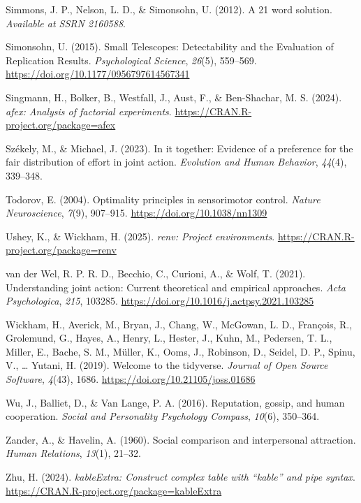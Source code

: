 \documentclass[
  man,
  floatsintext,
  longtable,
  nolmodern,
  notxfonts,
  notimes,
  colorlinks=true,linkcolor=blue,citecolor=blue,urlcolor=blue]{apa7}
\newlength{\cslhangindent}
\newenvironment{CSLReferences}[2] %
 {\begin{list}{}{%
  \setlength{\itemindent}{0pt}
  \setlength{\leftmargin}{0pt}
  \setlength{\parsep}{0pt}
  \ifodd #1
   \setlength{\leftmargin}{\cslhangindent}
   \setlength{\itemindent}{-1\cslhangindent}
  \fi
  \setlength{\itemsep}{#2\baselineskip}}}
 {\end{list}}
\begin{document}
\begin{CSLReferences}{1}{0}
Simmons, J. P., Nelson, L. D., \& Simonsohn, U. (2012). A 21 word
solution. \emph{Available at SSRN 2160588}.

Simonsohn, U. (2015). Small {Telescopes}: {Detectability} and the
{Evaluation} of {Replication Results}. \emph{Psychological Science},
\emph{26}(5), 559--569. \url{https://doi.org/10.1177/0956797614567341}

Singmann, H., Bolker, B., Westfall, J., Aust, F., \& Ben-Shachar, M. S.
(2024). \emph{{afex}: Analysis of factorial experiments}.
\url{https://CRAN.R-project.org/package=afex}

Székely, M., \& Michael, J. (2023). In it together: {Evidence} of a
preference for the fair distribution of effort in joint action.
\emph{Evolution and Human Behavior}, \emph{44}(4), 339--348.

Todorov, E. (2004). Optimality principles in sensorimotor control.
\emph{Nature Neuroscience}, \emph{7}(9), 907--915.
\url{https://doi.org/10.1038/nn1309}

Ushey, K., \& Wickham, H. (2025). \emph{{renv}: Project environments}.
\url{https://CRAN.R-project.org/package=renv}

van der Wel, R. P. R. D., Becchio, C., Curioni, A., \& Wolf, T. (2021).
Understanding joint action: {Current} theoretical and empirical
approaches. \emph{Acta Psychologica}, \emph{215}, 103285.
\url{https://doi.org/10.1016/j.actpsy.2021.103285}

Wickham, H., Averick, M., Bryan, J., Chang, W., McGowan, L. D.,
François, R., Grolemund, G., Hayes, A., Henry, L., Hester, J., Kuhn, M.,
Pedersen, T. L., Miller, E., Bache, S. M., Müller, K., Ooms, J.,
Robinson, D., Seidel, D. P., Spinu, V., \ldots{} Yutani, H. (2019).
Welcome to the {tidyverse}. \emph{Journal of Open Source Software},
\emph{4}(43), 1686. \url{https://doi.org/10.21105/joss.01686}

Wu, J., Balliet, D., \& Van Lange, P. A. (2016). Reputation, gossip, and
human cooperation. \emph{Social and Personality Psychology Compass},
\emph{10}(6), 350--364.

Zander, A., \& Havelin, A. (1960). Social comparison and interpersonal
attraction. \emph{Human Relations}, \emph{13}(1), 21--32.

Zhu, H. (2024). \emph{{kableExtra}: Construct complex table with
{``{kable}''} and pipe syntax}.
\url{https://CRAN.R-project.org/package=kableExtra}

\end{CSLReferences}
\end{document}
